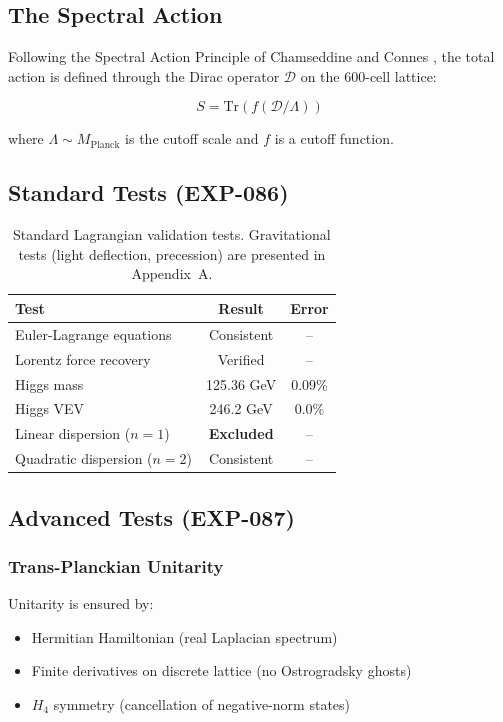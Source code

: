 \documentclass[12pt,a4paper]{article}
\begin{document}
\subsection{The Spectral Action}

Following the Spectral Action Principle of Chamseddine and Connes \cite{chamseddine1997}, the total action is defined through the Dirac operator $\mathcal{D}$ on the 600-cell lattice:

\begin{equation}
S = \text{Tr}(f(\mathcal{D}/\Lambda))
\end{equation}

where $\Lambda \sim M_{\text{Planck}}$ is the cutoff scale and $f$ is a cutoff function.

\subsection{Standard Tests (EXP-086)}

\begin{table}[H]
\centering
\begin{tabular}{lcc}
\toprule
\textbf{Test} & \textbf{Result} & \textbf{Error} \\
\midrule
Euler-Lagrange equations & Consistent & -- \\
Lorentz force recovery & Verified & -- \\
Higgs mass & 125.36 GeV & 0.09\% \\
Higgs VEV & 246.2 GeV & 0.0\% \\
Linear dispersion ($n=1$) & \textbf{Excluded} & -- \\
Quadratic dispersion ($n=2$) & Consistent & -- \\
\bottomrule
\end{tabular}
\caption{Standard Lagrangian validation tests. Gravitational tests (light deflection, precession) are presented in Appendix~A.}
\end{table}

\subsection{Advanced Tests (EXP-087)}

\subsubsection{Trans-Planckian Unitarity}

Unitarity is ensured by:
\begin{itemize}
    \item Hermitian Hamiltonian (real Laplacian spectrum)
    \item Finite derivatives on discrete lattice (no Ostrogradsky ghosts)
    \item $H_4$ symmetry (cancellation of negative-norm states)
\end{itemize}
\end{document}
